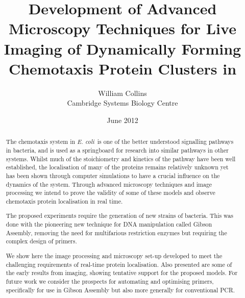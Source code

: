 \documentclass[12pt]{article}
\title{Development of Advanced Microscopy Techniques for Live Imaging of Dynamically Forming Chemotaxis Protein Clusters in \ecoli}
\date{June 2012}
\author{William Collins\\Cambridge Systems Biology Centre}
\newcommand{\ecoli}{\textit{E. coli~}}			%
\begin{document}
\maketitle
\begin{abstract}
The chemotaxis system in \ecoli is one of the better understood signalling pathways in bacteria, and is used as a springboard for research into similar pathways in other systems. Whilst much of the stoichiometry and kinetics of the pathway have been well established, the localisation of many of the proteins remains relatively unknown yet has been shown through computer simulations to have a crucial influence on the dynamics of the system. Through advanced microscopy techniques and image processing we intend to prove the validity of some of these models and observe chemotaxis protein localisation in real time.


The proposed experiments require the generation of new strains of bacteria. This was done with the pioneering new technique for DNA manipulation called Gibson Assembly, removing the need for multifarious restriction enzymes but requiring the complex design of primers.


We show here the image processing and microscopy set-up developed to meet the challenging requirements of real-time protein localisation. Also presented are some of the early results from imaging, showing tentative support for the proposed models. For future work we consider the prospects for automating and optimising primers, specifically for use in Gibson Assembly but also more generally for conventional PCR.
\end{abstract}
\newpage
\tableofcontents
\cleardoublepage

\cleardoublepage


\cleardoublepage


\cleardoublepage


\cleardoublepage


\cleardoublepage

\appendix

\cleardoublepage


\cleardoublepage

\printbibliography
\end{document}
